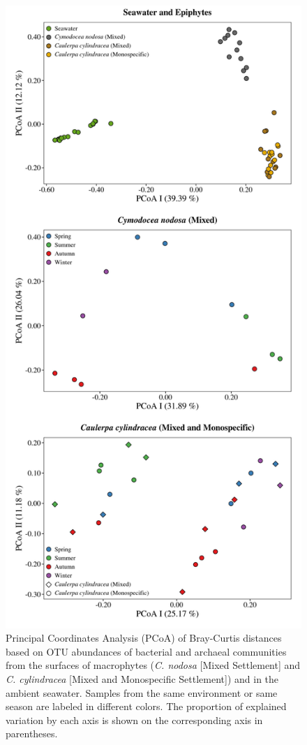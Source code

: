 \documentclass[12pt,]{article}
\begin{document}
\begin{figure}[H]

{\centering \includegraphics[width=0.55\linewidth]{../results/figures/pcoa_figure} 

}

\caption{Principal Coordinates Analysis (PCoA) of Bray-Curtis distances based on OTU abundances of bacterial and archaeal communities from the surfaces of macrophytes (\textit{C. nodosa} [Mixed Settlement] and \textit{C. cylindracea} [Mixed and Monospecific Settlement]) and in the ambient seawater. Samples from the same environment or same season are labeled in different colors. The proportion of explained variation by each axis is shown on the corresponding axis in parentheses.\label{pcoa}}\label{fig:unnamed-chunk-3}
\end{figure}
\end{document}
